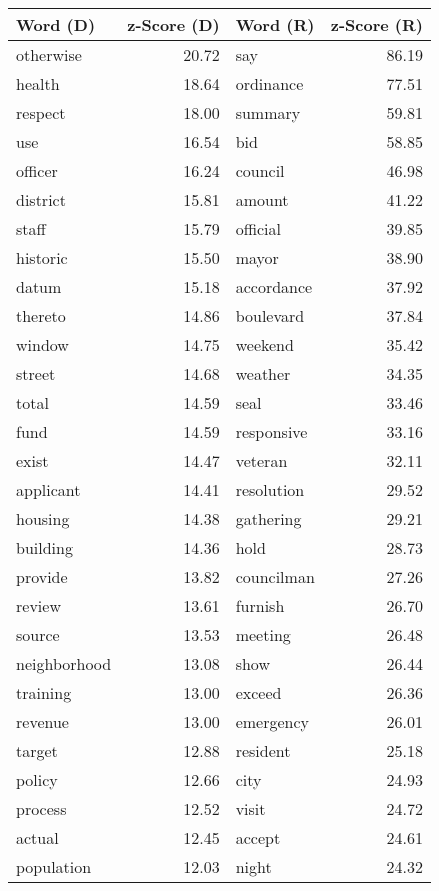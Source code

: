 \begin{table}[ht]
\centering
\begingroup\fontsize{9pt}{10pt}\selectfont
\begin{tabular}{lrlr}
  \hline
Word (D) & z-Score (D) & Word (R) & z-Score (R) \\ 
  \hline
otherwise & 20.72 & say & 86.19 \\ 
  health & 18.64 & ordinance & 77.51 \\ 
  respect & 18.00 & summary & 59.81 \\ 
  use & 16.54 & bid & 58.85 \\ 
  officer & 16.24 & council & 46.98 \\ 
  district & 15.81 & amount & 41.22 \\ 
  staff & 15.79 & official & 39.85 \\ 
  historic & 15.50 & mayor & 38.90 \\ 
  datum & 15.18 & accordance & 37.92 \\ 
  thereto & 14.86 & boulevard & 37.84 \\ 
  window & 14.75 & weekend & 35.42 \\ 
  street & 14.68 & weather & 34.35 \\ 
  total & 14.59 & seal & 33.46 \\ 
  fund & 14.59 & responsive & 33.16 \\ 
  exist & 14.47 & veteran & 32.11 \\ 
  applicant & 14.41 & resolution & 29.52 \\ 
  housing & 14.38 & gathering & 29.21 \\ 
  building & 14.36 & hold & 28.73 \\ 
  provide & 13.82 & councilman & 27.26 \\ 
  review & 13.61 & furnish & 26.70 \\ 
  source & 13.53 & meeting & 26.48 \\ 
  neighborhood & 13.08 & show & 26.44 \\ 
  training & 13.00 & exceed & 26.36 \\ 
  revenue & 13.00 & emergency & 26.01 \\ 
  target & 12.88 & resident & 25.18 \\ 
  policy & 12.66 & city & 24.93 \\ 
  process & 12.52 & visit & 24.72 \\ 
  actual & 12.45 & accept & 24.61 \\ 
  population & 12.03 & night & 24.32 \\ 

\end{tabular}
\end{table}
